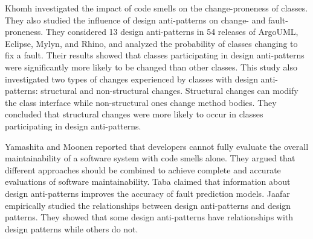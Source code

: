 Khomh \etal \cite{khomh2012exploratory} investigated the impact of code smells on the change-proneness of classes. They also studied the influence of design anti-patterns on change- and fault-proneness. They considered 13 design anti-patterns in 54 releases of ArgoUML, Eclipse, Mylyn, and Rhino, and analyzed the probability of classes changing to fix a fault. Their results showed that classes participating in design anti-patterns were significantly more likely to be changed than other classes. This study also investigated two types of changes experienced by classes with design anti-patterns: structural and non-structural changes. Structural changes can modify the class interface while non-structural ones change method bodies. They concluded that structural changes were more likely to occur in classes participating in design anti-patterns.

Yamashita and Moonen \cite{yamashita2013developers} reported that developers cannot fully evaluate the overall maintainability of a software system with code smells alone. They argued that different approaches should be combined to achieve complete and accurate evaluations of software maintainability. Taba \etal \cite{taba2013predicting} claimed that information about design anti-patterns improves the accuracy of fault prediction models. Jaafar \etal \cite{jaafar2013analysing} empirically studied the relationships between design anti-patterns and design patterns. They showed that some design anti-patterns have relationships with design patterns while others do not.